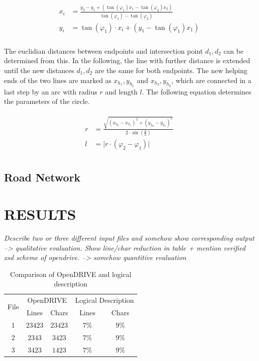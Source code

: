 \documentclass[a4paper, 10pt, conference]{ieeeconf}      %
\begin{document}
    \begin{align}
        \begin{split}
            x_i &= \frac{y_2 - y_1 + \left(\tan(\varphi_1) x_1 - \tan(\varphi_2) x_2\right)}{\tan(\varphi_1) - \tan(\varphi_2)} \\
            y_i &= \tan(\varphi_1) \cdot x_i+ \left(y_1 - \tan(\varphi_1) x_1\right)\\
        \end{split}     
    \end{align}

    The euclidian distances between endpoints and intersection point \(d_1, d_2\) can be determined from this. In the following, the line with further distance is extended until the new distances \(d_1, d_2\) are the same for both endpoints. The new helping ends of the two lines are marked as \(x_{h_1}, y_{h_1}\) and \(x_{h_2}, y_{h_2}\), which are connected in a last step by an arc with radius \(r\) and length \(l\). The following equation determines the parameters of the circle.

    \begin{align}
        \begin{split}           
        r &= \frac{\sqrt{\left(x_{h_2} - x_{h_1}\right)^2 + \left(y_{h_2} - y_{h_1}\right)^2}}{2 \cdot \sin\left(\frac{a}{2}\right)} \\
        l &= \vert r \cdot \left(\varphi_2 - \varphi_1\right) \vert \\  
        \end{split}
    \end{align}


\subsection{Road Network}

\clearpage %
\section{RESULTS}
\textit{Describe two or three different input files and somehow show corresponding output --> qualitative evaluation. Show line/char reduction in table + mention verified xsd scheme of opendrive. --> somehow quantitive evaluation}
\begin{table}[h]
\caption{Comparison of OpenDRIVE and logical description}
\label{tab_comparison}
\def\arraystretch{1.5}
\begin{center}
\begin{tabular}{c|cccc}
\multirow{2}{*}{File} & \multicolumn{2}{c}{OpenDRIVE} & \multicolumn{2}{c}{Logical Description}\\
& Lines & Chars & Lines & Chars \\
\hline
1 & $23423$ & $23423$& $7\%$ &$9\%$\\
2 & $2343$ & $3423$& $7\%$ &$9\%$\\
3 & $3423$ & $1423$& $7\%$ &$9\%$
\end{tabular}
\end{center}
\end{table}
\end{document}
